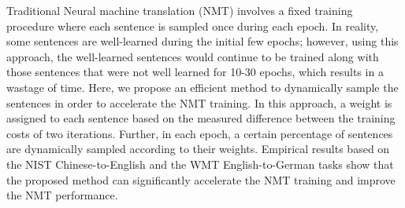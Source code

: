 Traditional Neural machine translation (NMT) involves a fixed training procedure where each sentence is sampled once during each epoch. In reality, some sentences are well-learned during the initial few epochs; however, using this approach, the well-learned sentences would continue to be trained along with those sentences that were not well learned for 10-30 epochs, which results in a wastage of time. Here, we propose an efficient method to dynamically sample the sentences in order to accelerate the NMT training. In this approach, a weight is assigned to each sentence based on the measured difference between the training costs of two iterations. Further, in each epoch, a certain percentage of sentences are dynamically sampled according to their weights. Empirical results based on the NIST Chinese-to-English and the WMT English-to-German tasks show that the proposed method can significantly accelerate the NMT training and improve the NMT performance.
